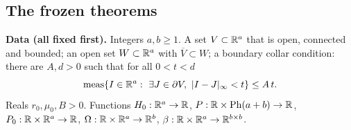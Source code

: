 \subsection{The frozen theorems}\label{bpP:p0:theorems}

\begin{theorem}\label{bpP:p0:pg}
\textbf{Data (all fixed first).} Integers $a,b\ge1$. A set $V\subset\mathbb{R}^a$ that is open, connected and bounded; an open set
$W\subset\mathbb{R}^a$ with $\overline V\subset W$; a boundary collar condition: there are $A,d>0$ such that for all $0<t<d$
\[\meas\{I\in\R^a:\ \exists J\in\partial V,\ \abs{I-J}_\infty<t\}\le A\,t.\]
Reals $r_0,\mu_0,B>0$. Functions $H_0:\mathbb{R}^a\to\mathbb{R}$, $P:\mathbb{R}\times\mathrm{Ph}(a+b)\to\mathbb{R}$, $P_0:\mathbb{R}\times\mathbb{R}^a\to\mathbb{R}$, $\Omega:\mathbb{R}\times\mathbb{R}^a\to\mathbb{R}^b$,
$\beta:\mathbb{R}\times\mathbb{R}^a\to\mathbb{R}^{b\times b}$.


\end{theorem}
